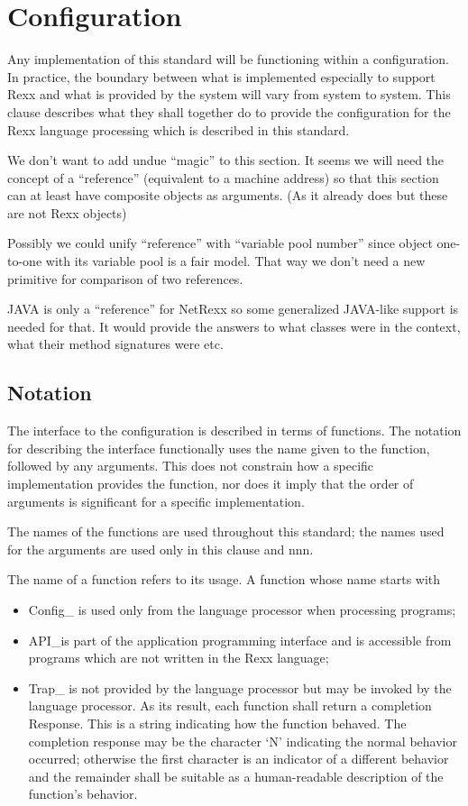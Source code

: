 \chapter{Configuration}\label{configuration}

Any implementation of this standard will be functioning within a
configuration. In practice, the boundary between what is implemented
especially to support Rexx and what is provided by the system will vary
from system to system. This clause describes what they shall together do
to provide the configuration for the Rexx language processing which is
described in this standard.

We don't want to add undue ``magic'' to this section. It seems we will
need the concept of a ``reference'' (equivalent to a machine address) so
that this section can at least have composite objects as arguments. (As
it already does but these are not Rexx objects)

Possibly we could unify ``reference'' with ``variable pool number''
since object one-to-one with its variable pool is a fair model. That way
we don't need a new primitive for comparison of two references.

JAVA is only a ``reference'' for NetRexx so some generalized JAVA-like
support is needed for that. It would provide the answers to what classes
were in the context, what their method signatures were etc.

\section{Notation}\label{notation}

The interface to the configuration is described in terms of functions.
The notation for describing the interface functionally uses the name
given to the function, followed by any arguments. This does not
constrain how a specific implementation provides the function, nor does
it imply that the order of arguments is significant for a specific
implementation.

The names of the functions are used throughout this standard; the names
used for the arguments are used only in this clause and nnn.

The name of a function refers to its usage. A function whose name starts
with

\begin{itemize}
\item
  Config\_ is used only from the language processor when processing
  programs;
\item
  API\_is part of the application programming interface and is
  accessible from programs which are not written in the Rexx language;
\item
  Trap\_ is not provided by the language processor but may be invoked by
  the language processor. As its result, each function shall return a
  completion Response. This is a string indicating how the function
  behaved. The completion response may be the character `N' indicating
  the normal behavior occurred; otherwise the first character is an
  indicator of a different behavior and the remainder shall be suitable
  as a human-readable description of the function's behavior.
\end{itemize}

